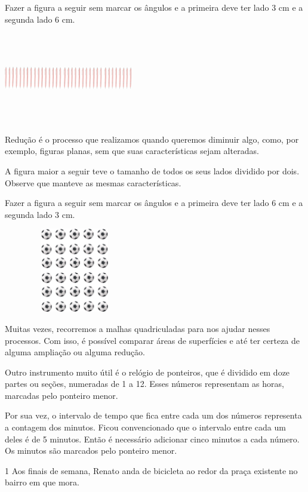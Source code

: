 \begin{mdframed}[linewidth=2pt,linecolor=salmao,roundcorner=2pt]
{Fazer a figura a seguir sem marcar os ângulos e a primeira deve ter lado
3 cm e a segunda lado 6 cm.

\includegraphics[width=2.21154in,height=1.55185in]{media/image56.png}

Redução é o processo que realizamos quando queremos diminuir algo,
como, por exemplo, figuras planas, sem que suas características
sejam alteradas.

A figura maior a seguir teve o tamanho de todos os seus lados dividido por dois. Observe que manteve as
mesmas características.

Fazer a figura a seguir sem marcar os ângulos e a primeira deve ter lado
6 cm e a segunda lado 3 cm.

\includegraphics[width=2.44231in,height=1.44820in]{media/image57.png}

Muitas vezes, recorremos a malhas quadriculadas para nos
ajudar nesses processos. Com isso, é possível comparar áreas de
superfícies e até ter certeza de alguma ampliação ou alguma redução.

Outro instrumento muito útil é o relógio de ponteiros, que é dividido em doze partes ou
seções, numeradas de 1 a 12. Esses números representam as horas, marcadas pelo ponteiro menor.

Por sua vez, o intervalo de tempo que fica entre cada um dos números
representa a contagem dos minutos. Ficou convencionado que o
intervalo entre cada um deles é de 5 minutos. Então é necessário adicionar cinco minutos a cada número. Os minutos são marcados pelo ponteiro menor.
}


\num{1} Aos finais de semana, Renato anda de bicicleta ao redor da praça
existente no bairro em que mora.


\end{mdframed}
